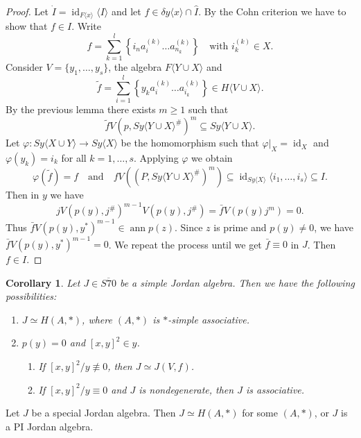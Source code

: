 \documentclass{article}
\newtheorem{corollary}[theorem]{Corollary}
\begin{document}
\begin{proof}
Let $\dot{I}=\operatorname{id}_{F\langle x\rangle}\langle I\rangle$ and let $f \in \delta y\langle x\rangle \cap \hat{I}$.
By the Cohn criterion we have to show that $f \in I$. Write
\[
f=\sum_{k=1}^{l}\left\{i_{n}a_{i}^{(k)}\ldots a_{n_{k}}^{(k)}\right\} \quad \text{with } i_{k}^{(k)} \in X.
\]
Consider $V=\{y_{1},\ldots,y_{s}\}$, the algebra $F\langle Y \cup X\rangle$ and
\[
\tilde{f}=\sum_{i=1}^{l}\left\{y_{k}a_{i}^{(k)}\ldots a_{i_{k}}^{(k)}\right\} \in H\langle V \cup X\rangle.
\]
By the previous lemma there exists $m \geq 1$ such that
\[
\tilde{f}V\left(p, S y\langle Y \cup X\rangle^{\#}\right)^{m} \subseteq S y\langle Y \cup X\rangle.
\]
Let $\varphi: S y\langle X \cup Y\rangle \rightarrow S y\langle X\rangle$ be the homomorphism such that $\varphi|_{X}=\operatorname{id}_{X}$ and $\varphi(y_{k})=i_{k}$ for all $k=1,\ldots,s$. Applying $\varphi$ we obtain
\[
\varphi(\tilde{f})=f \quad \text{and} \quad f V\left(\left(P, S y\langle Y \cup X\rangle^{\#}\right)^{m}\right) \subseteq \operatorname{id}_{S y\langle X\rangle}\langle i_{1},\ldots,i_{s}\rangle \subseteq I.
\]
Then in $y$ we have
\[
j V\left(p(y), j^{\#}\right)^{m-1} V\left(p(y), j^{\#}\right)=\bar{f} V\left(p(y) j^{m}\right)=0.
\]
Thus $\bar{f} V\left(p(y), y^{*}\right)^{m-1} \in \operatorname{ann} p(z)$. Since $z$ is prime and $p(y) \neq 0$, we have $\bar{f} V\left(p(y), y^{*}\right)^{m-1}=0$. We repeat the process until we get $\bar{f} \equiv 0$ in $J$. Then $f \in I$.
\end{proof}

\begin{corollary}
Let $J \in \overline{S 70}$ be a simple Jordan algebra. Then we have the following possibilities:
\begin{enumerate}
\item $J \simeq H(A,*)$, where $(A,*)$ is $*$-simple associative.
\item $p(y)=0$ and $[x,y]^{2} \in y$.
\begin{enumerate}
\item If $[x,y]^{2}/y \not\equiv 0$, then $J \simeq J(V,f)$.
\item If $[x,y]^{2}/y \equiv 0$ and $J$ is nondegenerate, then $J$ is associative.
\end{enumerate}
\end{enumerate}
\end{corollary}

\begin{theorem}
Let $J$ be a special Jordan algebra. Then $J \simeq H(A,*)$ for some $(A,*)$, or $J$ is a PI Jordan algebra.
\end{theorem}
\end{document}
